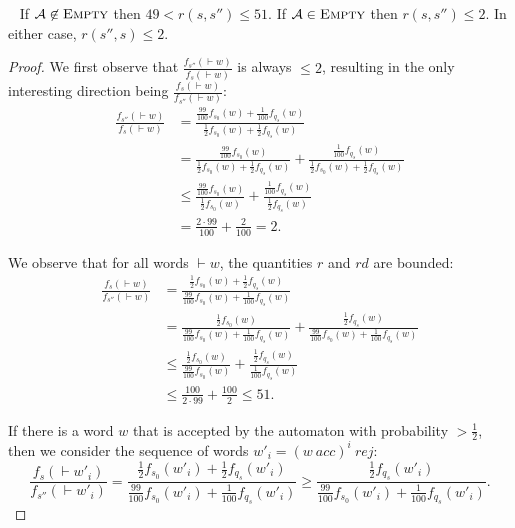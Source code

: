 \documentclass{lmcs}
\theoremstyle{plain}
\theoremstyle{definition}
\theoremstyle{remark}
\newcommand\acc{\mathit{acc}}
\newcommand\rej{\mathit{rej}}
\newcommand\tvra{\mathit{r}}
\newcommand\tvrs{\mathit{rd}}
\newcommand\pa{\mathcal{A}}
\renewcommand\nu{f}
\begin{document}
\begin{lem}\label{claim:gapproblem}~
If $\pa \not\in\textsc{Empty}$ then $49 < \tvra(s,s'') \le 51$.
If $\pa\in\textsc{Empty}$ then $\tvra(s,s'') \le 2$. In either case, $\tvra(s'',s) \le 2$.
\end{lem}

\begin{proof}

We first observe that $\frac{\nu_{s''}({\vdash} w)}{\nu_s({\vdash} w)}$ is always $\le 2$, resulting in the only interesting direction being $\frac{\nu_s({\vdash} w)}{\nu_{s''}({\vdash} w)}$:
\begin{align*}
\frac{\nu_{s''}({\vdash} w)}{\nu_s({\vdash} w)}
&= \frac{\frac{99}{100}\nu_{s_0}(w)+ \frac{1}{100}\nu_{q_s}(w)}{\frac{1}{2}\nu_{s_0}(w) + \frac{1}{2}\nu_{q_s}(w)}
\\&= \frac{\frac{99}{100}\nu_{s_0}(w)}{\frac{1}{2}\nu_{s_0}(w) + \frac{1}{2}\nu_{q_s}(w)}+\frac{\frac{1}{100}\nu_{q_s}(w)}{\frac{1}{2}\nu_{s_0}(w) + \frac{1}{2}\nu_{q_s}(w)}
\\ & \le \frac{\frac{99}{100}\nu_{s_0}(w)}{\frac{1}{2}\nu_{s_0}(w)}+\frac{\frac{1}{100}\nu_{q_s}(w)}{\frac{1}{2}\nu_{q_s}(w)}
\\ & = \frac{2 \cdot 99}{100}+ \frac{2}{100} = 2.
\end{align*}

We observe that for all words ${\vdash} w$, the quantities $\tvra$ and $\tvrs$ are bounded:
\begin{align*}
\frac{\nu_s({\vdash} w)}{\nu_{s''}({\vdash} w)}
&= \frac{\frac{1}{2}\nu_{s_0}(w) + \frac{1}{2}\nu_{q_s}(w)}{\frac{99}{100}\nu_{s_0}(w)+ \frac{1}{100}\nu_{q_s}(w)}
\\&= \frac{\frac{1}{2}\nu_{s_0}(w)}{\frac{99}{100}\nu_{s_0}(w)+ \frac{1}{100}\nu_{q_s}(w)} +  \frac{\frac{1}{2}\nu_{q_s}(w)}{\frac{99}{100}\nu_{s_0}(w)+ \frac{1}{100}\nu_{q_s}(w)}
\\ & \le \frac{\frac{1}{2}\nu_{s_0}(w)}{\frac{99}{100}\nu_{s_0}(w)} +  \frac{\frac{1}{2}\nu_{q_s}(w)}{\frac{1}{100}\nu_{q_s}(w)}
\\ & \le \frac{100}{2\cdot 99} + \frac{100}{2} \le 51.
\end{align*}

If there is a word $w$ that is accepted by the automaton with probability
$>\frac{1}{2}$, then we consider the sequence of words $w'_i = (w\ \acc)^i\ \rej$:
\begin{equation*}
\frac{\nu_s({\vdash}w'_i)}{\nu_{s''}({\vdash}w'_i)}= \frac{\frac{1}{2}\nu_{s_0}(w'_i) + \frac{1}{2}\nu_{q_s}(w'_i)}{\frac{99}{100}\nu_{s_0}(w'_i)+ \frac{1}{100}\nu_{q_s}(w'_i)}
\ge \frac{\frac{1}{2}\nu_{q_s}(w'_i)}{\frac{99}{100}\nu_{s_0}(w'_i)+ \frac{1}{100}\nu_{q_s}(w'_i)}. \end{equation*}


\end{proof}
\end{document}
